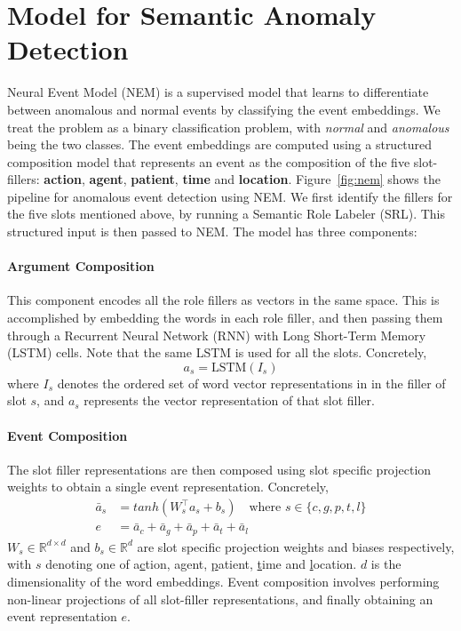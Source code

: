 \section{Model for Semantic Anomaly Detection}
Neural Event Model (NEM) is a supervised model that learns to differentiate between anomalous and
normal events by 
classifying the event embeddings. We treat the problem as a binary classification problem, with
\textit{normal} and \textit{anomalous} being the two classes.
The event embeddings are computed using a structured composition model
that represents an event as the composition of the five slot-fillers: \textbf{action},
\textbf{agent}, \textbf{patient}, \textbf{time} and \textbf{location}.
Figure~\ref{fig:nem} shows the pipeline for anomalous event detection using NEM. We
first identify the fillers for the five slots mentioned above, by running a Semantic Role Labeler (SRL).
This structured input is then passed to NEM. The model has three components:

\paragraph{Argument Composition} This component encodes all the role fillers as vectors in the same space.
This is accomplished by embedding the words in each role filler, and then passing them through a Recurrent
Neural Network (RNN) with Long Short-Term Memory (LSTM) \citep{hochreiter1997long} cells. Note that the same LSTM is
used for all the slots. Concretely,
\begin{equation}
 a_s = \text{LSTM}(I_s)
\end{equation}
where $I_s$ denotes the ordered set of word vector representations in in the filler of slot $s$, and
$a_s$ represents the vector representation of that slot filler.

\paragraph{Event Composition} The slot filler representations are then composed using slot specific
projection weights to obtain a single event representation. Concretely,
\begin{align}
 \bar{a}_s &= tanh(W_s^\intercal a_s + b_s) \quad \text{where } s \in \{c,g,p,t,l\} \\
 e &=  \bar{a}_c + \bar{a}_g + \bar{a}_p + \bar{a}_t + \bar{a}_l 
\end{align}
$W_s \in \mathbb{R}^{d \times d}$ and $b_s \in \mathbb{R}^{d}$ are slot specific projection weights and biases respectively, with $s$ denoting one of a\underline{c}tion,
a\underline{g}ent, \underline{p}atient, \underline{t}ime and \underline{l}ocation. $d$ is the dimensionality of the word embeddings.
Event composition involves performing non-linear projections of all slot-filler representations, and finally obtaining an event representation
$e$.

